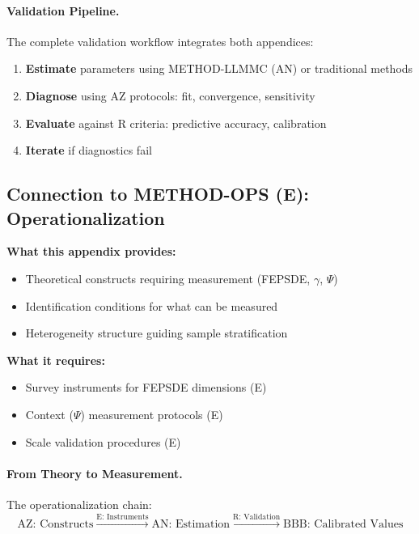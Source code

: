 \paragraph{Validation Pipeline.}
The complete validation workflow integrates both appendices:
\begin{enumerate}
\item \textbf{Estimate} parameters using METHOD-LLMMC (AN) or traditional methods
\item \textbf{Diagnose} using AZ protocols: fit, convergence, sensitivity
\item \textbf{Evaluate} against R criteria: predictive accuracy, calibration
\item \textbf{Iterate} if diagnostics fail
\end{enumerate}

\subsection{Connection to METHOD-OPS (E): Operationalization}

\begin{tcolorbox}[colback=yellow!5!white, colframe=yellow!75!black,
    title=Integration: METHOD-CONSTRUCT $\leftrightarrow$ METHOD-OPS (E)]
\textbf{What this appendix provides:}
\begin{itemize}[nosep]
\item Theoretical constructs requiring measurement (FEPSDE, $\gamma$, $\Psi$)
\item Identification conditions for what can be measured
\item Heterogeneity structure guiding sample stratification
\end{itemize}

\textbf{What it requires:}
\begin{itemize}[nosep]
\item Survey instruments for FEPSDE dimensions (E)
\item Context ($\Psi$) measurement protocols (E)
\item Scale validation procedures (E)
\end{itemize}
\end{tcolorbox}

\paragraph{From Theory to Measurement.}
The operationalization chain:
\begin{equation}
\text{AZ: Constructs} \xrightarrow{\text{E: Instruments}} \text{AN: Estimation} \xrightarrow{\text{R: Validation}} \text{BBB: Calibrated Values}
\end{equation}

